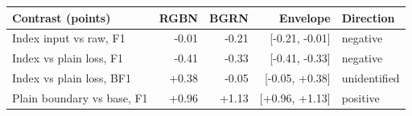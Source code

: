 \footnotesize
\setlength{\tabcolsep}{3.2pt}
\begin{tabular}{@{}lrrrl@{}}
\toprule
Contrast (points) & RGBN & BGRN & Envelope & Direction \\
\midrule
Index input vs raw, F1 & -0.01 & -0.21 & [-0.21, -0.01] & negative \\
Index vs plain loss, F1 & -0.41 & -0.33 & [-0.41, -0.33] & negative \\
Index vs plain loss, BF1 & +0.38 & -0.05 & [-0.05, +0.38] & unidentified \\
Plain boundary vs base, F1 & +0.96 & +1.13 & [+0.96, +1.13] & positive \\
\bottomrule
\end{tabular}
